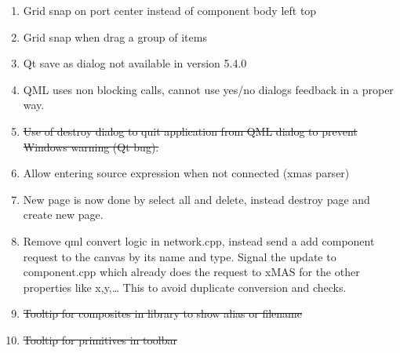 \begin{enumerate}\label{sec:fix-list}
\item	Grid snap on port center instead of component body left top
\item	Grid snap when drag a group of items
\item	Qt save as dialog not available in version 5.4.0
\item QML uses non blocking calls, cannot use yes/no dialogs feedback in a
proper way.
\item \st{Use of destroy dialog to quit application from QML dialog to prevent
Windows warning (Qt bug).}
\item Allow entering source expression when not connected (xmas parser)
\item New page is now done by select all and delete, instead destroy page and
create new page.
\item Remove qml convert logic in network.cpp, instead send a add component
request to the canvas by its name and type. Signal the update to component.cpp
which already does the request to xMAS for the other properties like x,y,… This
to avoid duplicate conversion and checks.
\item	\st{Tooltip for composites in library to show alias or filename}
\item	\st{Tooltip for primitives in toolbar}
\end{enumerate}
